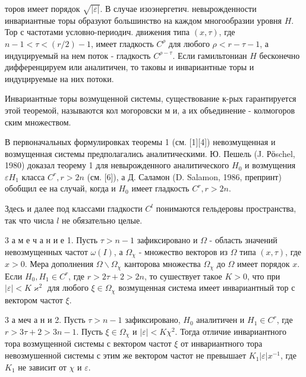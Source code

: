 \documentclass[10pt]{article}
\begin{document}
торов имеет порядок $\sqrt{|\varepsilon|}$. В случае изоэнергетич. невырожденности инвариантные торы образуют большинство на каждом многообразии уровня $H$. Тор с частотами условно-периодич. движения типа $(x, \tau)$, где $n-1<\tau<(r / 2)-1$, имеет гладкость $C^{\rho}$ для любого $\rho<r-\tau-1$, а индуцируемый на нем поток - гладкость $C^{\rho-\tau}$. Если гамильтониан $H$ бесконечно дифференцируем или аналитичен, то таковы и инвариантные торы и индуцируемые на них потоки.



Инвариантные торы возмущенной системы, существование к-рых гарантируется этой теоремой, называются кол могоровски м и, а их объединение - колмогоров ским множеством.



В первоначальных формулировках теоремы 1 (см. [1][4]) невозмущенная и возмущенная системы предполагались аналитическими. Ю. Пешель (J. Рӧschel, 1980) доказал теорему 1 для невырожденного аналитического $H_{0}$ и возмущения $\varepsilon H_{1}$ класса $C^{r}, r>2 n$ (см. [6]), а Д. Саламон (D. Salamon, 1986, препринт) обобщил ее на случай, когда и $H_{0}$ имеет гладкость $C^{r}, r>2 n$.



Здесь и далее под классами гладкости $C^{l}$ понимаются гельдеровы пространства, так что числа $l$ не обязательно целые.



3 а м е ч а н и е 1. Пусть $\tau>n-1$ зафиксировано и $\Omega$ - область значений невозмущенных частот $\omega(I)$, а $\Omega_{\chi}$ - множество векторов из $\Omega$ типа $(x, \tau)$, где $x>0$. Мера дополнения $\Omega \backslash \Omega_{\chi}$ канторова множества $\Omega_{\chi}$ до $\Omega$ имеет порядок $x$. Если $H_{0}, H_{1} \in C^{r}$, где $r>2 \tau+2>2 n$, то сушествует такое $K>0$, что при $|\varepsilon|<K \varkappa^{2}$ для любого $\xi \in \Omega_{\chi}$ возмущенная система имеет инвариантный тор с вектором частот $\xi$.



3 а меч а н и 2. Пусть $\tau>n-1$ зафиксировано, $H_{0}$ аналитичен и $H_{1} \in C^{r}$, где $r>3 \tau+2>3 n-1$. Пусть $\xi \in \Omega_{\chi}$ и $|\varepsilon|<K \chi^{2}$. Тогда отличие инвариантного тора возмущенной системы с вектором частот $\xi$ от инвариантного тора невозмушенной системы с этим же вектором частот не превышает $K_{1}|\varepsilon| x^{-1}$, где $K_{1}$ не зависит от $\chi$ и $\varepsilon$.
\end{document}
